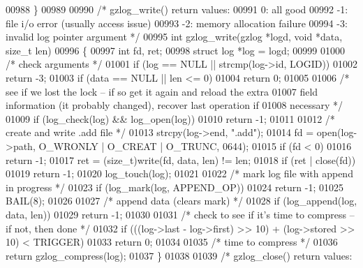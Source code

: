 \begin{DoxyCode}
{00988 \}
00989 
00990 \textcolor{comment}{/* gzlog\_write() return values:}
00991 \textcolor{comment}{    0: all good}
00992 \textcolor{comment}{   -1: file i/o error (usually access issue)}
00993 \textcolor{comment}{   -2: memory allocation failure}
00994 \textcolor{comment}{   -3: invalid log pointer argument */}
00995 \textcolor{keywordtype}{int} gzlog\_write(gzlog *logd, \textcolor{keywordtype}{void} *data, \textcolor{keywordtype}{size\_t} len)
00996 \{
00997     \textcolor{keywordtype}{int} fd, ret;
00998     \textcolor{keyword}{struct }log *log = logd;
00999 
01000     \textcolor{comment}{/* check arguments */}
01001     \textcolor{keywordflow}{if} (log == NULL || strcmp(log->id, LOGID))
01002         \textcolor{keywordflow}{return} -3;
01003     \textcolor{keywordflow}{if} (data == NULL || len <= 0)
01004         \textcolor{keywordflow}{return} 0;
01005 
01006     \textcolor{comment}{/* see if we lost the lock -- if so get it again and reload the extra}
01007 \textcolor{comment}{       field information (it probably changed), recover last operation if}
01008 \textcolor{comment}{       necessary */}
01009     \textcolor{keywordflow}{if} (log\_check(log) && log\_open(log))
01010         \textcolor{keywordflow}{return} -1;
01011 
01012     \textcolor{comment}{/* create and write .add file */}
01013     strcpy(log->end, \textcolor{stringliteral}{".add"});
01014     fd = open(log->path, O\_WRONLY | O\_CREAT | O\_TRUNC, 0644);
01015     \textcolor{keywordflow}{if} (fd < 0)
01016         \textcolor{keywordflow}{return} -1;
01017     ret = (size\_t)write(fd, data, len) != len;
01018     \textcolor{keywordflow}{if} (ret | close(fd))
01019         \textcolor{keywordflow}{return} -1;
01020     log\_touch(log);
01021 
01022     \textcolor{comment}{/* mark log file with append in progress */}
01023     \textcolor{keywordflow}{if} (log\_mark(log, APPEND\_OP))
01024         \textcolor{keywordflow}{return} -1;
01025     BAIL(8);
01026 
01027     \textcolor{comment}{/* append data (clears mark) */}
01028     \textcolor{keywordflow}{if} (log\_append(log, data, len))
01029         \textcolor{keywordflow}{return} -1;
01030 
01031     \textcolor{comment}{/* check to see if it's time to compress -- if not, then done */}
01032     \textcolor{keywordflow}{if} (((log->last - log->first) >> 10) + (log->stored >> 10) < TRIGGER)
01033         \textcolor{keywordflow}{return} 0;
01034 
01035     \textcolor{comment}{/* time to compress */}
01036     \textcolor{keywordflow}{return} gzlog\_compress(log);
01037 \}
01038 
01039 \textcolor{comment}{/* gzlog\_close() return values:}
}
\end{DoxyCode}
